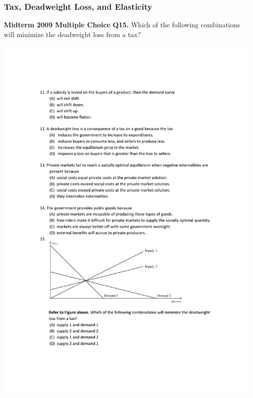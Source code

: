 \documentclass[12pt, xcolor=dvipsnames]{beamer}
\begin{document}
\begin{frame}
\frametitle{\bf Tax, Deadweight Loss, and Elasticity}
\noindent \small \textsf{\bfseries Midterm 2009 Multiple Choice Q15.}
Which of the following combinations will minimize the deadweight loss from a tax?
\begin{center}
\includegraphics[width=\linewidth]{figures/10.pdf}
\end{center}
\end{frame}
\end{document}

